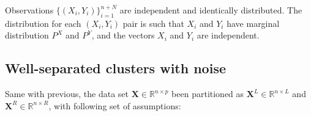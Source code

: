 \documentclass[11pt]{article}
\newcommand{\R}{\mathbb{R}}
\begin{document}
Observations $\{ (X_i, Y_i) \}_{i=1}^{n+N}$ are independent and identically
distributed.  The distribution for each $(X_i, Y_i)$ pair is such that $X_i$
and $Y_i$ have marginal distribution $P^X$ and $P^Y$, and the vectors $X_i$
and $Y_i$ are independent.



\clearpage


\subsection{Well-separated clusters with noise}

Same with previous, the data set $\mathbf{X} \in \R^{n \times p}$ been
partitioned as $\mathbf{X}^L \in \R^{n \times L}$ and $\mathbf{X}^R
\in \R^{n \times R}$, with following set of assumptions:
\end{document}
